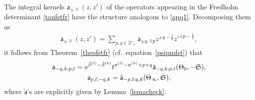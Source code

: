 \documentclass[pdftex]{sigma}
\numberwithin{equation}{section}
\begin{document}
The integral kernels $\mathsf a_{\pm\mp}(z,z')$ of the operators appearing in the Fredholm determinant \eqref{taufstfr} have the structure analogous to \eqref{apq1}. Decomposing them as
\begin{gather*}
\mathsf a_{\pm\mp}(z,z')=\sum_{p,q\in\mathbb Z'_+} \mathsf a_{\pm q,\mp p} z^{\pm q-\frac12}z'^{\pm p-\frac12},
\end{gather*}
it follows from Theorem~\ref{theofstfr} (cf.\ equation~\eqref{psipmfst}) that
\begin{gather*}
\mathsf a_{-q,k;p,l}= {\rm e}^{\tilde\beta^{(l)}-\tilde\beta^{(k)}}t^{\sigma^{(l)}-\sigma^{(k)}+p+q}\check{\mathsf a}_{-q,k;p,l}(\Theta_0,-\mathfrak S),\\
\mathsf a_{p,l;-q,k}= \check{\mathsf a}_{-p,l;q,k}(\Theta_{\infty},\mathfrak S),
\end{gather*}
where $\check{\mathsf a}$'s are explicitly given by Lemma~\ref{lemacheck}.
\end{document}
